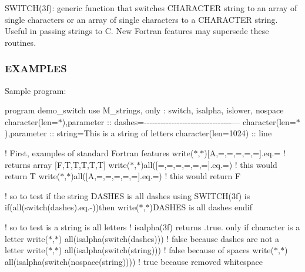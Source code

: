 \begin{DoxyVerb}SWITCH(3f): generic function that switches CHARACTER string to an array
of single characters or an array of single characters to a CHARACTER
string. Useful in passing strings to C.  New Fortran features may
supersede these routines.
\end{DoxyVerb}


\subsubsection*{E\+X\+A\+M\+P\+L\+ES}

Sample program\+:

program demo\+\_\+switch use M\+\_\+strings, only \+: switch, isalpha, islower, nospace character(len=$\ast$),parameter \+:\+: dashes=\textquotesingle{}-\/-\/-\/-\/-\/-\/-\/-\/-\/-\/-\/-\/-\/-\/-\/-\/-\/-\/-\/-\/-\/-\/-\/-\/-\/-\/-\/-\/-\/-\/-\/-\/---\textquotesingle{} character(len=$\ast$),parameter \+:\+: string=\textquotesingle{}This is a string of letters\textquotesingle{} character(len=1024) \+:\+: line

! First, examples of standard Fortran features write($\ast$,$\ast$)\mbox{[}\textquotesingle{}A\textquotesingle{},\textquotesingle{}=\textquotesingle{},\textquotesingle{}=\textquotesingle{},\textquotesingle{}=\textquotesingle{},\textquotesingle{}=\textquotesingle{},\textquotesingle{}=\textquotesingle{}\mbox{]}.eq.\textquotesingle{}=\textquotesingle{} ! returns array \mbox{[}F,T,T,T,T,T\mbox{]} write($\ast$,$\ast$)all(\mbox{[}\textquotesingle{}=\textquotesingle{},\textquotesingle{}=\textquotesingle{},\textquotesingle{}=\textquotesingle{},\textquotesingle{}=\textquotesingle{},\textquotesingle{}=\textquotesingle{},\textquotesingle{}=\textquotesingle{}\mbox{]}.eq.\textquotesingle{}=\textquotesingle{}) ! this would return T write($\ast$,$\ast$)all(\mbox{[}\textquotesingle{}A\textquotesingle{},\textquotesingle{}=\textquotesingle{},\textquotesingle{}=\textquotesingle{},\textquotesingle{}=\textquotesingle{},\textquotesingle{}=\textquotesingle{},\textquotesingle{}=\textquotesingle{}\mbox{]}.eq.\textquotesingle{}=\textquotesingle{}) ! this would return F

! so to test if the string D\+A\+S\+H\+ES is all dashes using S\+W\+I\+T\+C\+H(3f) is if(all(switch(dashes).eq.\textquotesingle{}-\/\textquotesingle{}))then write($\ast$,$\ast$)\textquotesingle{}D\+A\+S\+H\+ES is all dashes\textquotesingle{} endif

! so to test is a string is all letters ! isalpha(3f) returns .true. only if character is a letter write($\ast$,$\ast$) all(isalpha(switch(dashes))) ! false because dashes are not a letter write($\ast$,$\ast$) all(isalpha(switch(string))) ! false because of spaces write($\ast$,$\ast$) all(isalpha(switch(nospace(string)))) ! true because removed whitespace

